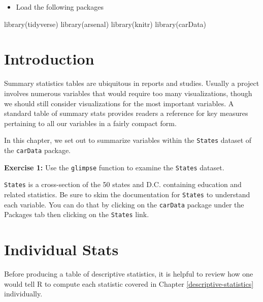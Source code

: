 \documentclass[
]{book}
\makeatletter
\newenvironment{Shaded}{\begin{snugshade}}{\end{snugshade}}
\newcommand{\FunctionTok}[1]{\textcolor[rgb]{0,0,0}{#1}}
\newcommand{\NormalTok}[1]{#1}
\providecommand{\tightlist}{%
  \setlength{\itemsep}{0pt}\setlength{\parskip}{0pt}}
\newenvironment{kframe}{%
\medskip{}
\setlength{\fboxsep}{.8em}
 \def\at@end@of@kframe{}%
 \ifinner\ifhmode%
  \def\at@end@of@kframe{\end{minipage}}%
  \begin{minipage}{\columnwidth}%
 \fi\fi%
 \def\FrameCommand##1{\hskip\@totalleftmargin \hskip-\fboxsep
 \colorbox{shadecolor}{##1}\hskip-\fboxsep
     \hskip-\linewidth \hskip-\@totalleftmargin \hskip\columnwidth}%
 \MakeFramed {\advance\hsize-\width
   \@totalleftmargin\z@ \linewidth\hsize
   \@setminipage}}%
 {\par\unskip\endMakeFramed%
 \at@end@of@kframe}
\renewenvironment{Shaded}{\begin{kframe}}{\end{kframe}}
\newenvironment{rmdblock}[1]
  {\begin{shaded*}
  }
  {\end{shaded*}
  }
\newenvironment{learncheck}
  {\begin{rmdblock}{warning}}
  {\end{rmdblock}}
\makeatother
\begin{document}
\begin{itemize}
\tightlist
\item
  Load the following packages
\end{itemize}

\begin{Shaded}
\begin{Highlighting}[]
\FunctionTok{library}\NormalTok{(tidyverse)}
\FunctionTok{library}\NormalTok{(arsenal)}
\FunctionTok{library}\NormalTok{(knitr)}
\FunctionTok{library}\NormalTok{(carData)}
\end{Highlighting}
\end{Shaded}

\hypertarget{introduction}{%
\section{Introduction}\label{introduction}}

Summary statistics tables are ubiquitous in reports and studies. Usually a project involves numerous variables that would require too many visualizations, though we should still consider visualizations for the most important variables. A standard table of summary stats provides readers a reference for key measures pertaining to all our variables in a fairly compact form.

In this chapter, we set out to summarize variables within the \texttt{States} dataset of the \texttt{carData} package.

\begin{learncheck}
\textbf{Exercise 1:} Use the \texttt{glimpse} function to examine the
\texttt{States} dataset.
\end{learncheck}

\texttt{States} is a cross-section of the 50 states and D.C. containing education and related statistics. Be sure to skim the documentation for \texttt{States} to understand each variable. You can do that by clicking on the \texttt{carData} package under the Packages tab then clicking on the \texttt{States} link.

\hypertarget{individual-stats}{%
\section{Individual Stats}\label{individual-stats}}

Before producing a table of descriptive statistics, it is helpful to review how one would tell R to compute each statistic covered in Chapter \ref{descriptive-statistics} individually.
\end{document}
